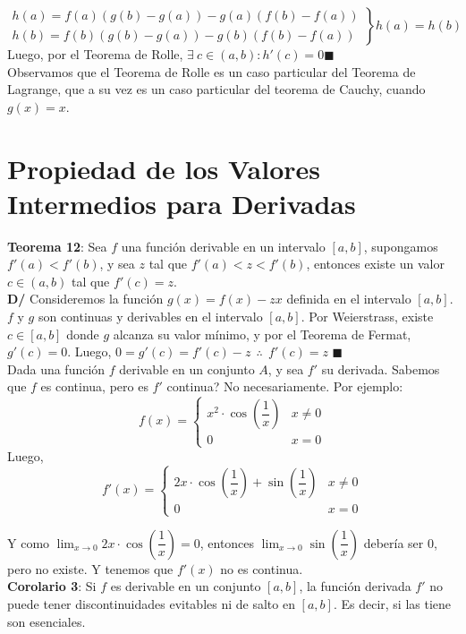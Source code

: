 \documentclass[11pt,a4paper]{article}
\newcommand*{\QEDA}{\null\nobreak\hfill\ensuremath{\blacksquare}}
\begin{document}
$\left.\begin{array}{l}
h(a) = f(a)(g(b)-g(a))-g(a)(f(b)-f(a))\\
h(b) = f(b)(g(b)-g(a))-g(b)(f(b)-f(a))
\end{array}\right\} h(a)=h(b)$\\
Luego, por el Teorema de Rolle, $\exists\ c \in (a,b) : h'(c) = 0$\QEDA\\

Observamos que el Teorema de Rolle es un caso particular del Teorema de Lagrange, que a su vez es un caso particular del teorema de Cauchy, cuando $g(x)=x$.

\newpage
\section{Propiedad de los Valores Intermedios para Derivadas}
\textbf{Teorema 12}: Sea $f$ una funci\'on derivable en un intervalo $[a,b]$, supongamos $f'(a) < f'(b)$, y sea $z$ tal que $f'(a)<z<f'(b)$, entonces existe un valor $c \in (a,b)$ tal que $f'(c) = z$.\\
\textbf{D/} Consideremos la funci\'on $g(x)=f(x)-zx$ definida en el intervalo $[a,b]$. $f$ y $g$ son continuas y derivables en el intervalo $[a,b]$. Por Weierstrass, existe $c \in [a,b]$ donde $g$ alcanza su valor m\'inimo, y por el Teorema de Fermat, $g'(c) = 0$. Luego, $0 = g'(c) = f'(c) - z \ \ \therefore \ \ f'(c) = z$ \QEDA\\

Dada una funci\'on $f$ derivable en un conjunto $A$, y sea $f'$ su derivada. Sabemos que $f$ es continua, pero es $f'$ continua? No necesariamente. Por ejemplo:
$$f(x) = \left\{\begin{array}{ll}
x^2\cdot \cos\left(\dfrac{1}{x}\right) & x\not=0\\
0 & x=0
\end{array}\right.$$
Luego, 
$$f'(x) = \left\{\begin{array}{ll}
2x\cdot \cos\left(\dfrac{1}{x}\right) + \sin\left(\dfrac{1}{x}\right) & x\not=0\\
0 & x=0
\end{array}\right.$$

Y como $\displaystyle{\lim_{x \to 0} 2x\cdot \cos\left(\dfrac{1}{x}\right) = 0}$, entonces $\displaystyle{\lim_{x \to 0} \sin\left(\dfrac{1}{x}\right)}$ deber\'ia ser 0, pero no existe. Y tenemos que $f'(x)$ no es continua.\\

\noindent \textbf{Corolario 3}: Si $f$ es derivable en un conjunto $[a,b]$, la funci\'on derivada $f'$ no puede tener discontinuidades evitables ni de salto en $[a,b]$. Es decir, si las tiene son esenciales.
\end{document}
